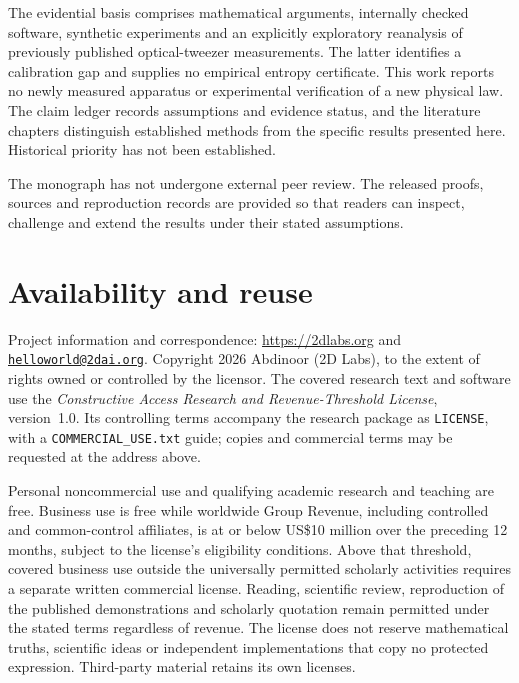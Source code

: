 \documentclass[11pt,oneside]{book}
\theoremstyle{definition}
\theoremstyle{remark}
\begin{document}
The evidential basis comprises mathematical arguments, internally checked
software, synthetic experiments and an explicitly exploratory reanalysis of
previously published optical-tweezer measurements. The latter identifies a
calibration gap and supplies no empirical entropy certificate. This work
reports no newly measured apparatus or experimental verification of a new
physical law. The claim ledger records assumptions and evidence status, and
the literature chapters distinguish established methods from the specific
results presented here. Historical priority has not been established.

The monograph has not undergone external peer review. The
released proofs, sources and reproduction records are provided so that readers
can inspect, challenge and extend the results under their stated assumptions.

\section*{Availability and reuse}

Project information and correspondence:
\url{https://2dlabs.org} and
\href{mailto:helloworld@2dai.org}{\nolinkurl{helloworld@2dai.org}}.
Copyright \textcopyright{} 2026 Abdinoor (2D Labs), to the extent of rights
owned or controlled by the licensor. The covered research text and software
use the \emph{Constructive Access Research and Revenue-Threshold License},
version~1.0. Its controlling terms accompany the research package as
\texttt{LICENSE}, with a \texttt{COMMERCIAL\_USE.txt} guide; copies and
commercial terms may be requested at the address above.

Personal noncommercial use and qualifying academic research and teaching are
free. Business use is free while worldwide Group Revenue, including controlled
and common-control affiliates, is at or below US\$10 million over the preceding
12 months, subject to the license's eligibility conditions. Above that
threshold, covered business use outside the universally permitted scholarly
activities requires a separate written commercial license. Reading, scientific
review, reproduction of the published demonstrations and scholarly quotation
remain permitted under the stated terms regardless of revenue. The license
does not reserve mathematical truths, scientific ideas or independent
implementations that copy no protected expression. Third-party material
retains its own licenses.

\tableofcontents
\end{document}
